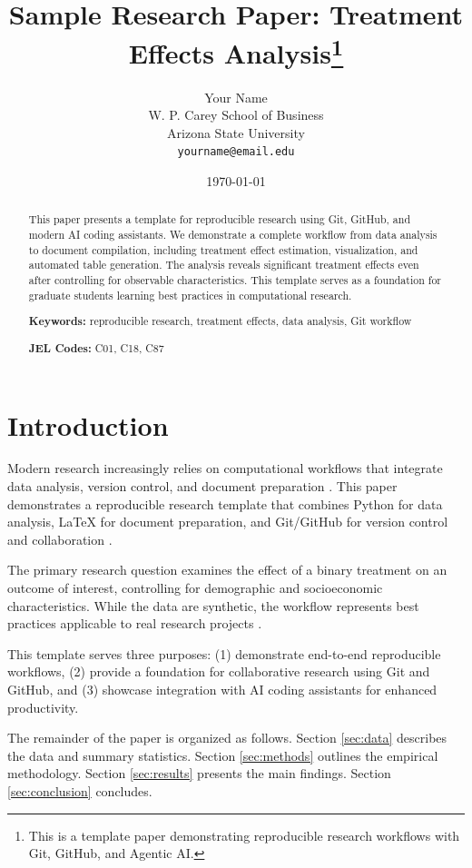\documentclass[11pt,letterpaper]{article}
\title{Sample Research Paper: Treatment Effects Analysis\thanks{This is a template paper demonstrating reproducible research workflows with Git, GitHub, and Agentic AI.}}
\author{Your Name\\
W. P. Carey School of Business\\
Arizona State University\\
\texttt{yourname@email.edu}}
\date{\today}
\begin{document}
\maketitle

\begin{abstract}
\noindent This paper presents a template for reproducible research using Git, GitHub, and modern AI coding assistants. We demonstrate a complete workflow from data analysis to document compilation, including treatment effect estimation, visualization, and automated table generation. The analysis reveals significant treatment effects even after controlling for observable characteristics. This template serves as a foundation for graduate students learning best practices in computational research.

\vspace{0.2cm}
\noindent \textbf{Keywords:} reproducible research, treatment effects, data analysis, Git workflow

\vspace{0.2cm}
\noindent \textbf{JEL Codes:} C01, C18, C87
\end{abstract}

\onehalfspacing

\section{Introduction}

Modern research increasingly relies on computational workflows that integrate data analysis, version control, and document preparation \citep{example2019}. This paper demonstrates a reproducible research template that combines Python for data analysis, LaTeX for document preparation, and Git/GitHub for version control and collaboration \citep{github2024}.

The primary research question examines the effect of a binary treatment on an outcome of interest, controlling for demographic and socioeconomic characteristics. While the data are synthetic, the workflow represents best practices applicable to real research projects \citep{example2020}.

This template serves three purposes: (1) demonstrate end-to-end reproducible workflows, (2) provide a foundation for collaborative research using Git and GitHub, and (3) showcase integration with AI coding assistants for enhanced productivity.

The remainder of the paper is organized as follows. Section \ref{sec:data} describes the data and summary statistics. Section \ref{sec:methods} outlines the empirical methodology. Section \ref{sec:results} presents the main findings. Section \ref{sec:conclusion} concludes.
\end{document}
